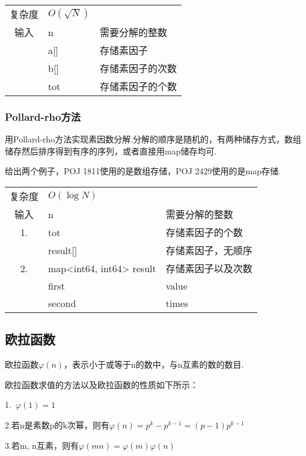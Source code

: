 \begin{longtable}{|c|l|l|}
复杂度 & $O(\sqrt{N})$ &  \\
输入 & n & 需要分解的整数 \\
 & a[] & 存储素因子 \\
 & b[] & 存储素因子的次数 \\
 & tot & 存储素因子的个数 \\
\end{longtable}



        \subsubsection{Pollard-rho方法}\small
用Pollard-rho方法实现素因数分解.分解的顺序是随机的，有两种储存方式，数组
储存然后排序得到有序的序列，或者直接用map储存均可.

给出两个例子，POJ 1811使用的是数组存储，POJ 2429使用的是map存储.

\begin{longtable}{|c|l|l|}
复杂度 & $O(\log N)$ &  \\
输入 & n & 需要分解的整数 \\
 1. & tot & 存储素因子的个数 \\
 & result[] & 存储素因子，无顺序 \\
 2. & map<int64, int64> result & 存储素因子以及次数 \\
 & first & value \\
 & second & times \\
\end{longtable}



    \subsection{欧拉函数}\small
欧拉函数$\varphi (n)$，表示小于或等于n的数中，与n互素的数的数目.

欧拉函数求值的方法以及欧拉函数的性质如下所示：

1.\ $\varphi (1) = 1$

2.若n是素数p的k次幂，则有$\varphi (n) = p^{k} - p^{k - 1} = (p - 1)p^{k - 1}$

3.若m, n互素，则有$\varphi (mn)=\varphi (m)\varphi (n)$


